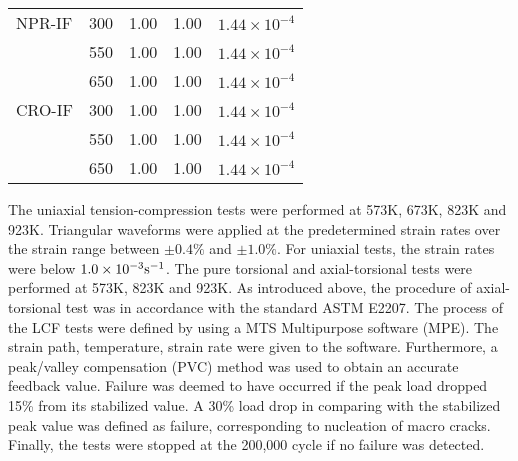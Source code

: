 \begin{table}[htbp]
\begin{tabular}{p{2cm}p{2cm}p{3cm}p{3cm}p{2cm}}
    \midrule
    NPR-IF  & 300   & 1.00  & 1.00  & $1.44\times 10^{-4}$ \\
          & 550   & 1.00  & 1.00  & $1.44\times 10^{-4}$ \\
          & 650   & 1.00  & 1.00  & $1.44\times 10^{-4}$ \\
    \midrule
    CRO-IF  & 300   & 1.00  & 1.00  & $1.44\times 10^{-4}$ \\
          & 550   & 1.00  & 1.00  & $1.44\times 10^{-4}$ \\
          & 650   & 1.00  & 1.00  & $1.44\times 10^{-4}$ \\
    \bottomrule
    \end{tabular}%
  \label{tab:Loading-Conditions}%
\end{table}%

The uniaxial tension-compression tests were performed at 573K, 673K, 823K and 923K.
Triangular waveforms were applied at the predetermined strain rates over the strain range between $\pm 0.4\%$ and $\pm 1.0\%$.
For uniaxial tests, the strain rates were below $1.0\times 10^{-3}\rm{s}^{-1}$.
The pure torsional and axial-torsional tests were performed at 573K, 823K and 923K.
As introduced above, the procedure of axial-torsional test was in accordance with the standard ASTM E2207.
The process of the LCF tests were defined by using a MTS Multipurpose software (MPE).
The strain path, temperature, strain rate were given to the software.
Furthermore, a peak/valley compensation (PVC) method was used to obtain an accurate feedback value.
Failure was deemed to have occurred if the peak load dropped 15\% from its stabilized value. A 30\% load drop in comparing with the stabilized peak value was defined as failure, corresponding to nucleation of macro cracks.
Finally, the tests were stopped at the 200,000 cycle if no failure was detected.


